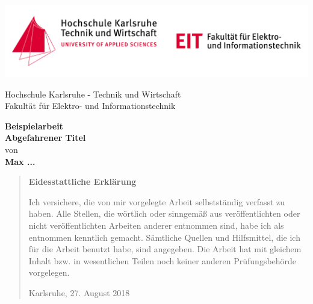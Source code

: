 


\pagestyle{empty}
\begin{titlepage}
	\includegraphics[width=1\textwidth]{figures/hska-eit-header-logo.pdf}
	
	\vspace{1cm}	
	
	\begin{center}
		\Large{Hochschule Karlsruhe - Technik und Wirtschaft}\\
		\Large{Fakultät für Elektro- und Informationstechnik}
	\end{center}
	
	\vspace{1cm}
	
	\begin{center}
		\textbf{\huge{Beispielarbeit}}\\
		\vspace{0.5cm}
		\textbf{\LARGE{Abgefahrener Titel}}\\
		\vspace{1cm}
		\large{von}\\
		\textbf{\large{Max ...}}\\
	\end{center}
\end{titlepage}
\pagestyle{plain}
\begin{quote}
	\vspace*{4cm}
	
	\begin{center}
		\textbf{\Large\sffamily Eidesstattliche Erklärung}
	\end{center}
	
	Ich versichere, die von mir vorgelegte Arbeit selbstständig verfasst zu haben. Alle Stellen, die wörtlich oder sinngemäß aus veröffentlichten oder nicht veröffentlichten Arbeiten anderer entnommen sind, habe ich als entnommen kenntlich gemacht. Sämtliche Quellen und Hilfsmittel, die ich für die Arbeit benutzt habe, sind angegeben. Die Arbeit hat mit gleichem Inhalt bzw. in wesentlichen Teilen noch keiner anderen Prüfungsbehörde vorgelegen.
	
	\vspace{2em}
	
	Karlsruhe, 27. August 2018
\end{quote}
